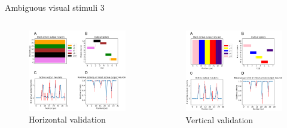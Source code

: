 \documentclass[aspectratio=169]{beamer}
\begin{document}
\begin{frame}{Ambiguous visual stimuli 3}
   \begin{columns}[onlytextwidth]
	\begin{column}{0.5\textwidth}
	 \vspace{-1.5cm}
	        \begin{figure}
        \includegraphics[width=0.8\linewidth]{../Latex/figures/horvertAdaptiveInh/horizontal_validation.png}
      \\   \scriptsize Horizontal validation
      \end{figure} 
	\end{column}
	\begin{column}{0.5\textwidth}
	\vspace{-1.5cm}
		        \begin{figure}
        \includegraphics[width=0.8\linewidth]{../Latex/figures/horvertAdaptiveInh/vertical_validation.png}
      \\   \scriptsize Vertical validation
      \end{figure} 
	\end{column}
  \end{columns}
\end{frame}
\end{document}
